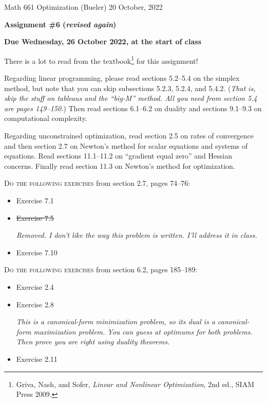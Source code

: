 \documentclass[12pt]{amsart}
\begin{document}
\scriptsize \noindent Math 661 Optimization (Bueler) \hfill 20 October, 2022
\normalsize

\medskip\bigskip

\Large\centerline{\textbf{Assignment \#6 \quad (\emph{revised again})}}
\large
\bigskip

\centerline{\textbf{Due Wednesday, 26 October 2022, at the start of class}}
\bigskip
\normalsize

\thispagestyle{empty}

\bigskip
There is a lot to read from the textbook\footnote{Griva, Nash, and Sofer, \emph{Linear and Nonlinear Optimization}, 2nd ed., SIAM Press 2009.} for this assignment!

Regarding linear programming, please read sections 5.2--5.4 on the simplex method, but note that you can skip subsections 5.2.3, 5.2.4, and 5.4.2.  (\emph{That is, skip the stuff on tableaus and the ``big-M'' method.  All you need from section 5.4 are pages 149--150.})  Then read sections 6.1--6.2 on duality and sections 9.1--9.3 on computational complexity.

Regarding unconstrained optimization, read section 2.5 on rates of convergence and then section 2.7 on Newton's method for scalar equations and systems of equations.  Read sections 11.1--11.2 on ``gradient equal zero'' and Hessian concerns.  Finally read section 11.3 on Newton's method for optimization.

\bigskip
\noindent \textsc{Do the following exercises} from section 2.7, pages 74--76:

\begin{itemize}
\item Exercise 7.1
\item \st{Exercise 7.5}  \quad \begin{minipage}[t]{4.0in}
\emph{Removed.  I don't like the way this problem is written.  I'll address it in class.}
\end{minipage}
\qquad 
\item Exercise 7.10
\end{itemize}

\bigskip
\noindent \textsc{Do the following exercises} from section 6.2, pages 185--189:

\begin{itemize}
\item Exercise 2.4
\item Exercise 2.8  \quad \begin{minipage}[t]{4.0in}
\emph{This is a canonical-form minimization problem, so its dual is a canonical-form maximization problem.  You can guess at optimums for both problems.  Then prove you are right using duality theorems.}
\end{minipage}
\item Exercise 2.11
\end{itemize}
\end{document}
